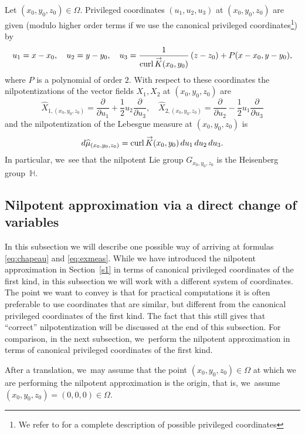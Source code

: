 \documentclass[10pt]{amsart}
\DeclareMathOperator{\curl}{curl}
\renewcommand{\vec}[1]
{\overset{\,{\raisebox{-2pt}{$\scriptstyle\to$}}}{#1}}
\theoremstyle{definition}
\newcommand{\1}{\mathbbm{1}}
\begin{document}
Let $(x_0,y_0,z_0)\in\Omega$. Privileged coordinates $(u_1,u_2,u_3)$ at $(x_0,y_0,z_0)$ are given (modulo higher order terms if we use the canonical privileged coordinates\footnote{We refer to \cite{ChoPo1,ChoPo2} for a complete description of possible privileged coordinates}) by
\begin{equation} \label{eq:cdv}
u_1= x-x_0,\quad u_2 = y-y_0,\quad u_3 = \frac{1}{\curl \vec{K} (x_0,y_0)} \,(z-z_0) + P (x-x_0,y-y_0),
\end{equation}
where $P$ is a polynomial of order $2$. With respect to these coordinates the nilpotentizations of the vector fields $X_1,X_2$ at $(x_0,y_0,z_0)$ are
\begin{equation}\label{eq:chapeau}
\widehat X_{1,(x_0,y_0,z_0)} = \frac{\partial}{\partial u_1} + \frac 12 u_2 \frac{\partial}{\partial u_3},\quad
\widehat X_{2,(x_0,y_0,z_0)} = \frac{\partial}{\partial u_2} - \frac 12 u_1 \frac{\partial}{\partial u_3}
\end{equation}
and the nilpotentization of the Lebesgue measure at $(x_0,y_0,z_0)$ is
\begin{equation}\label{eq:exmeas}
d\widehat\mu_{(x_0,y_0,z_0)} = \curl \vec{K} (x_0,y_0)\,du_1 \,du_2 \,du_3.
\end{equation}
In particular, we~see that the nilpotent Lie group $G_{x_0,y_0,z_0}$ is the Heisenberg group~$\mathbb H$.

\subsection{Nilpotent approximation via a direct change of variables}
In this subsection we will describe one possible way of arriving at formulas \eqref{eq:chapeau} and \eqref{eq:exmeas}. While we have introduced the nilpotent approximation in Section~\ref{s1} in terms of canonical privileged coordinates of the first kind, in this subsection we will work with a different system of coordinates. The point we want to convey is that for practical computations it is often preferable to use coordinates that are similar, but different from the canonical privileged coordinates of the first kind. The fact that this still gives that ``correct'' nilpotentization will be discussed at the end of this subsection. For comparison, in the next subsection, we~perform the nilpotent approximation in terms of canonical privileged coordinates of the first kind.

After a translation, we~may assume that the point $(x_0,y_0,z_0)\in\Omega$ at which we are performing the nilpotent approximation is the origin, that is, we~assume $(x_0,y_0,z_0)= (0,0,0) \in \Omega$.
\end{document}
